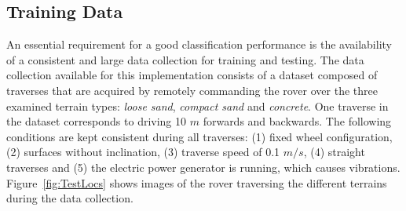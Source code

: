\subsection{Training Data}

An essential requirement for a good classification performance is the availability of a consistent and large data collection for training and testing. 
The data collection available for this implementation consists of a dataset composed of traverses that are acquired by remotely commanding the rover over the three examined terrain types: \emph{loose sand}, \emph{compact sand} and \emph{concrete}. 
One traverse in the dataset corresponds to driving 10 $m$ forwards and backwards. 
The following conditions are kept consistent during all traverses: (1) fixed wheel configuration, (2) surfaces without inclination, (3) traverse speed of 0.1 $m/s$, (4) straight traverses and (5) the electric power generator is running, which causes vibrations.
Figure~\ref{fig:TestLocs} shows images of the rover traversing the different terrains during the data collection.


